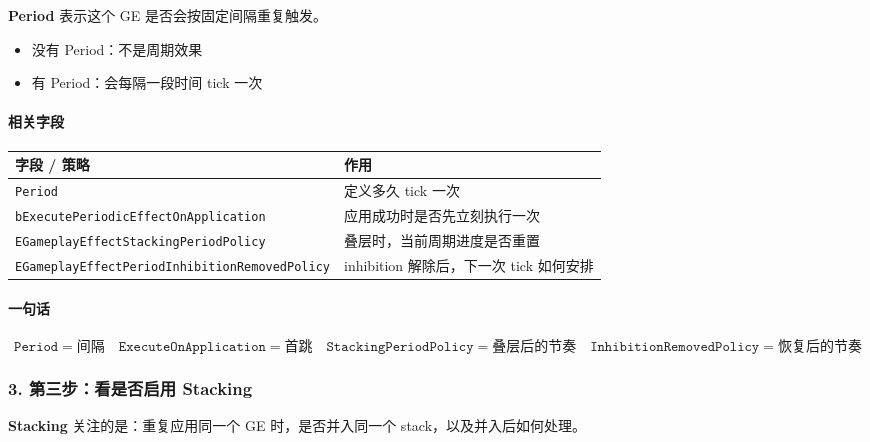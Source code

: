 \documentclass[CJKmath=true,10pt]{MyBook}
\begin{document}
\textbf{Period} 表示这个 GE 是否会按固定间隔重复触发。

\begin{itemize}
	\item 没有 Period：不是周期效果
	\item 有 Period：会每隔一段时间 tick 一次
\end{itemize}

\paragraph{相关字段}
\begin{longtable}{@{}p{}p{}@{}}
	\toprule
	\textbf{字段 / 策略} & \textbf{作用} \\
	\midrule
	\endhead
	
	\texttt{Period}
	&
	定义多久 tick 一次
	\\
	
	\texttt{bExecutePeriodicEffectOnApplication}
	&
	应用成功时是否先立刻执行一次
	\\
	
	\texttt{EGameplayEffectStackingPeriodPolicy}
	&
	叠层时，当前周期进度是否重置
	\\
	
	\texttt{EGameplayEffectPeriodInhibitionRemovedPolicy}
	&
	inhibition 解除后，下一次 tick 如何安排
	\\
	
	\bottomrule
\end{longtable}

\paragraph{一句话}
\[
\boxed{
	\texttt{Period} = 间隔
	\quad
	\texttt{ExecuteOnApplication} = 首跳
	\quad
	\texttt{StackingPeriodPolicy} = 叠层后的节奏
	\quad
	\texttt{InhibitionRemovedPolicy} = 恢复后的节奏
}
\]

\subsubsection{3. 第三步：看是否启用 Stacking}

\textbf{Stacking} 关注的是：重复应用同一个 GE 时，是否并入同一个 stack，以及并入后如何处理。
\end{document}
